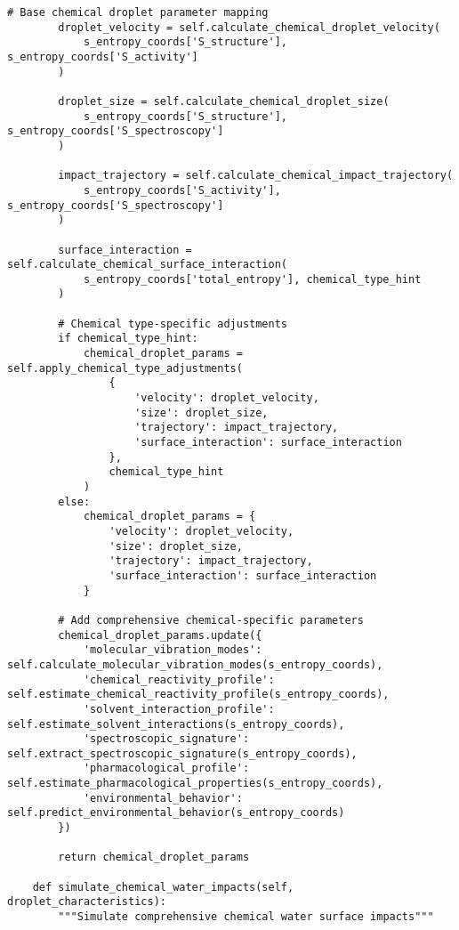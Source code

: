 \documentclass[12pt,a4paper]{article}
\begin{document}
\begin{algorithm}
\begin{algorithmic}[1]
\begin{lstlisting}[style=pythonstyle, caption=Core Molecule-to-Drip Implementation for Comprehensive Chemical Analysis]
        # Base chemical droplet parameter mapping
        droplet_velocity = self.calculate_chemical_droplet_velocity(
            s_entropy_coords['S_structure'], s_entropy_coords['S_activity']
        )
        
        droplet_size = self.calculate_chemical_droplet_size(
            s_entropy_coords['S_structure'], s_entropy_coords['S_spectroscopy']
        )
        
        impact_trajectory = self.calculate_chemical_impact_trajectory(
            s_entropy_coords['S_activity'], s_entropy_coords['S_spectroscopy']
        )
        
        surface_interaction = self.calculate_chemical_surface_interaction(
            s_entropy_coords['total_entropy'], chemical_type_hint
        )
        
        # Chemical type-specific adjustments
        if chemical_type_hint:
            chemical_droplet_params = self.apply_chemical_type_adjustments(
                {
                    'velocity': droplet_velocity,
                    'size': droplet_size,
                    'trajectory': impact_trajectory,
                    'surface_interaction': surface_interaction
                },
                chemical_type_hint
            )
        else:
            chemical_droplet_params = {
                'velocity': droplet_velocity,
                'size': droplet_size,
                'trajectory': impact_trajectory,
                'surface_interaction': surface_interaction
            }
        
        # Add comprehensive chemical-specific parameters
        chemical_droplet_params.update({
            'molecular_vibration_modes': self.calculate_molecular_vibration_modes(s_entropy_coords),
            'chemical_reactivity_profile': self.estimate_chemical_reactivity_profile(s_entropy_coords),
            'solvent_interaction_profile': self.estimate_solvent_interactions(s_entropy_coords),
            'spectroscopic_signature': self.extract_spectroscopic_signature(s_entropy_coords),
            'pharmacological_profile': self.estimate_pharmacological_properties(s_entropy_coords),
            'environmental_behavior': self.predict_environmental_behavior(s_entropy_coords)
        })
        
        return chemical_droplet_params
    
    def simulate_chemical_water_impacts(self, droplet_characteristics):
        """Simulate comprehensive chemical water surface impacts"""
        

\end{lstlisting}
\end{algorithmic}
\end{algorithm}
\end{document}
